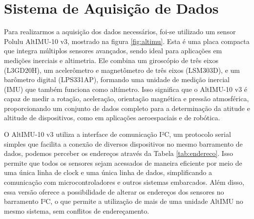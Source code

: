 \documentclass[
	12pt,				%
	openright,			%
	oneside,			%
	a4paper,			%
	english,			%
	brazil				%
	]{abntex2}
\begin{document}
\section{Sistema de Aquisição de Dados}

Para realizarmos a aquisição dos dados necessários, foi-se utilizado um sensor Polulu AltIMU-10 v3, mostrado na figura \ref{fig:altimu}. Esta é uma placa compacta que integra múltiplos sensores avançados, sendo ideal para aplicações em medições inerciais e altimetria. Ele combina um giroscópio de três eixos (L3GD20H), um acelerômetro e magnetômetro de três eixos (LSM303D), e um barômetro digital (LPS331AP), formando uma unidade de medição inercial (IMU) que também funciona como altímetro. Isso significa que o AltIMU-10 v3 é capaz de medir a rotação, aceleração, orientação magnética e pressão atmosférica, proporcionando um conjunto de dados completo para a determinação da atitude e altitude de dispositivos, como em aplicações aeroespaciais e de robótica.

O AltIMU-10 v3 utiliza a interface de comunicação I²C, um protocolo serial simples que facilita a conexão de diversos dispositivos no mesmo barramento de dados, podemos perceber os endereços através da Tabela \ref{tab:endereco}. Isso permite que todos os sensores sejam acessados de maneira eficiente por meio de uma única linha de clock e uma única linha de dados, simplificando a comunicação com microcontroladores e outros sistemas embarcados. Além disso, essa versão oferece a possibilidade de alterar os endereços dos sensores no barramento I²C, o que permite a utilização de mais de uma unidade AltIMU no mesmo sistema, sem conflitos de endereçamento.

\begin{table}[]
	\caption{Tabela de endereçamento de cada Barramento I²C}
	\label{tab:endereco}
\end{table}
\end{document}
